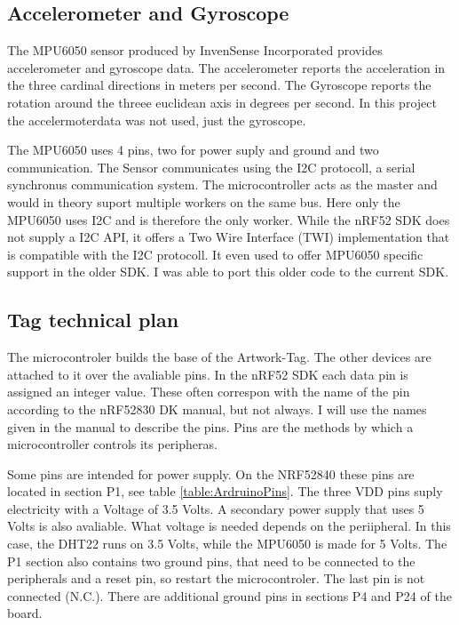 \subsection{Accelerometer and Gyroscope}
The MPU6050 sensor produced by InvenSense Incorporated provides accelerometer and gyroscope data.
The accelerometer reports the acceleration in the three cardinal directions in meters per second.
The Gyroscope reports the rotation around the threee euclidean axis in degrees per second.
In this project the accelermoterdata was not used, just the gyroscope.

The MPU6050 uses 4 pins, two for power suply and ground and two communication.
The Sensor communicates using the I2C protocoll, a serial synchronus communication system.
The microcontroller acts as the master and would in theory suport multiple workers on the same bus. 
Here only the MPU6050 uses I2C and is therefore the only worker.
While the nRF52 SDK does not supply a I2C API, it offers a Two Wire Interface (TWI) implementation that is compatible with the I2C protocoll.
It even used to offer MPU6050 specific support in the older SDK. 
I was able to port this older code to the current SDK.

\subsection{Tag technical plan}
The microcontroler builds the base of the Artwork-Tag. 
The other devices are attached to it over the avaliable pins.
In the nRF52 SDK each data pin is assigned an integer value. 
These often correspon with the name of the pin according to the nRF52830 DK manual, but not always.
I will use the names given in the manual to describe the pins.
Pins are the methods by which a microcontroller controls its peripheras.

Some pins are intended for power supply.
On the NRF52840 these pins are located in section P1, see table \ref{table:ArdruinoPins}.
The three VDD pins suply electricity with a Voltage of 3.5 Volts.
A secondary power supply that uses 5 Volts is also avaliable.
What voltage is needed depends on the periipheral.
In this case, the DHT22 runs on 3.5 Volts, while the MPU6050 is made for 5 Volts.
The P1 section also contains two ground pins, that need to be connected to the peripherals and a reset pin, so restart the microcontroler.
The last pin is not connected (N.C.).
There are additional ground pins in sections P4 and P24 of the board.

